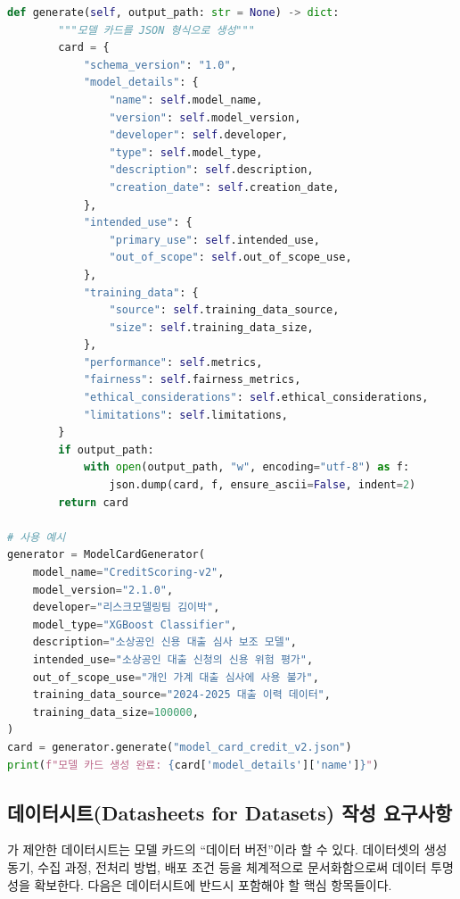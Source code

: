 \begin{lstlisting}[language=Python, caption={모델 카드 자동 생성기}, label={lst:model_card_auto}]
    def generate(self, output_path: str = None) -> dict:
        """모델 카드를 JSON 형식으로 생성"""
        card = {
            "schema_version": "1.0",
            "model_details": {
                "name": self.model_name,
                "version": self.model_version,
                "developer": self.developer,
                "type": self.model_type,
                "description": self.description,
                "creation_date": self.creation_date,
            },
            "intended_use": {
                "primary_use": self.intended_use,
                "out_of_scope": self.out_of_scope_use,
            },
            "training_data": {
                "source": self.training_data_source,
                "size": self.training_data_size,
            },
            "performance": self.metrics,
            "fairness": self.fairness_metrics,
            "ethical_considerations": self.ethical_considerations,
            "limitations": self.limitations,
        }
        if output_path:
            with open(output_path, "w", encoding="utf-8") as f:
                json.dump(card, f, ensure_ascii=False, indent=2)
        return card

# 사용 예시
generator = ModelCardGenerator(
    model_name="CreditScoring-v2",
    model_version="2.1.0",
    developer="리스크모델링팀 김이박",
    model_type="XGBoost Classifier",
    description="소상공인 신용 대출 심사 보조 모델",
    intended_use="소상공인 대출 신청의 신용 위험 평가",
    out_of_scope_use="개인 가계 대출 심사에 사용 불가",
    training_data_source="2024-2025 대출 이력 데이터",
    training_data_size=100000,
)
card = generator.generate("model_card_credit_v2.json")
print(f"모델 카드 생성 완료: {card['model_details']['name']}")
\end{lstlisting}

\subsection{데이터시트(Datasheets for Datasets) 작성 요구사항}
\label{sec:10.1.3}

\cite{gebru2021datasheets}가 제안한 데이터시트는 모델 카드의 ``데이터 버전''이라 할 수 있다. 데이터셋의 생성 동기, 수집 과정, 전처리 방법, 배포 조건 등을 체계적으로 문서화함으로써 데이터 투명성을 확보한다. 다음은 데이터시트에 반드시 포함해야 할 핵심 항목들이다.

